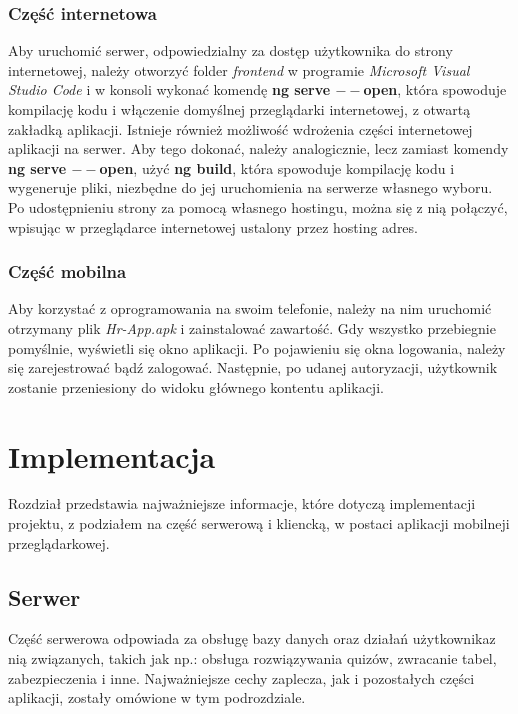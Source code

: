 \documentclass[twoside]{projektInzynierskiMS}
\numberwithin{figure}{section}
\begin{document}
\subsubsection{Część internetowa}
Aby uruchomić serwer, odpowiedzialny za dostęp użytkownika do strony internetowej, należy  otworzyć folder \textit{frontend} w programie \textit{Microsoft Visual Studio Code} i w konsoli wykonać komendę \textbf{ng serve $--$open}, która spowoduje kompilację kodu i włączenie domyślnej przeglądarki internetowej, z otwartą zakładką aplikacji.
Istnieje również możliwość wdrożenia części internetowej aplikacji na serwer. Aby tego dokonać, należy analogicznie, lecz zamiast komendy \textbf{ng serve $--$open}, użyć \textbf{ng build}, która spowoduje kompilację kodu i wygeneruje pliki, niezbędne do jej uruchomienia na serwerze własnego wyboru. Po udostępnieniu strony za pomocą własnego hostingu, można się z nią połączyć, wpisując w przeglądarce internetowej ustalony przez hosting adres.

\subsubsection{Część mobilna}

Aby korzystać z oprogramowania na swoim telefonie, należy na nim uruchomić otrzymany plik \textit{Hr-App.apk} i zainstalować zawartość. Gdy wszystko przebiegnie pomyślnie, wyświetli się okno aplikacji. Po pojawieniu się okna logowania, należy się zarejestrować bądź zalogować. Następnie, po udanej autoryzacji, użytkownik zostanie przeniesiony do widoku głównego kontentu aplikacji.

\section{Implementacja}
Rozdział przedstawia najważniejsze informacje, które dotyczą implementacji projektu, z podziałem na część serwerową i kliencką, w postaci aplikacji mobilnej\linebreak i przeglądarkowej.

\subsection{Serwer}
Część serwerowa odpowiada za obsługę bazy danych oraz działań użytkownika\linebreak z nią związanych, takich jak np.: obsługa rozwiązywania quizów, zwracanie tabel, zabezpieczenia i inne. Najważniejsze cechy zaplecza, jak i pozostałych części aplikacji, zostały omówione w tym podrozdziale.
\end{document}
